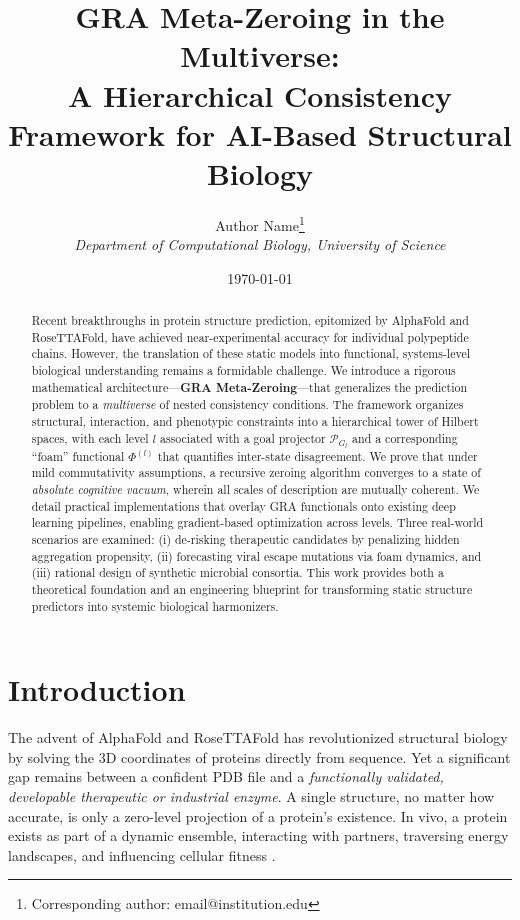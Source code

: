 \documentclass[11pt]{article}
\title{\textbf{GRA Meta-Zeroing in the Multiverse:\\ A Hierarchical Consistency Framework for AI-Based Structural Biology}}
\author{Author Name\thanks{Corresponding author: email@institution.edu} \\
\small \textit{Department of Computational Biology, University of Science}
}
\date{\today}
\newcommand{\cP}{\mathcal{P}}
\begin{document}
\maketitle

\begin{abstract}
Recent breakthroughs in protein structure prediction, epitomized by AlphaFold and RoseTTAFold, have achieved near-experimental accuracy for individual polypeptide chains. However, the translation of these static models into functional, systems-level biological understanding remains a formidable challenge. We introduce a rigorous mathematical architecture---\textbf{GRA Meta-Zeroing}---that generalizes the prediction problem to a \emph{multiverse} of nested consistency conditions. The framework organizes structural, interaction, and phenotypic constraints into a hierarchical tower of Hilbert spaces, with each level \(l\) associated with a goal projector \(\cP_{G_l}\) and a corresponding ``foam'' functional \(\Phi^{(l)}\) that quantifies inter-state disagreement. We prove that under mild commutativity assumptions, a recursive zeroing algorithm converges to a state of \emph{absolute cognitive vacuum}, wherein all scales of description are mutually coherent. We detail practical implementations that overlay GRA functionals onto existing deep learning pipelines, enabling gradient-based optimization across levels. Three real-world scenarios are examined: (i) de-risking therapeutic candidates by penalizing hidden aggregation propensity, (ii) forecasting viral escape mutations via foam dynamics, and (iii) rational design of synthetic microbial consortia. This work provides both a theoretical foundation and an engineering blueprint for transforming static structure predictors into systemic biological harmonizers.
\end{abstract}

\section{Introduction}

The advent of AlphaFold \cite{jumper2021highly} and RoseTTAFold \cite{baek2021accurate} has revolutionized structural biology by solving the 3D coordinates of proteins directly from sequence. Yet a significant gap remains between a confident PDB file and a \emph{functionally validated, developable therapeutic or industrial enzyme}. A single structure, no matter how accurate, is only a zero-level projection of a protein's existence. In vivo, a protein exists as part of a dynamic ensemble, interacting with partners, traversing energy landscapes, and influencing cellular fitness \cite{noauthor_rosettafold_2021}.
\end{document}
